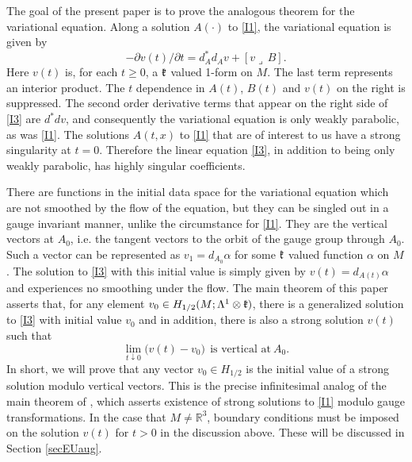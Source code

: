 \documentclass[12pt]{article}
\def \L{\Lambda}
\def \R{\mathbb R}
\def \kf{\frak k}
\def \p{\partial}
\def \beq{\begin{equation}}
\def \eeq{\end{equation}}
\def \eref{\eqref}
\def \lrc{\lrcorner\,}
\numberwithin{equation}{section}
\begin{document}
  The goal of the present paper is to prove the analogous theorem for the variational equation.
Along a solution $A(\cdot)$ to \eref{I1}, the variational equation 
 is given by
\beq
-\p v(t)/\p t = d_A^*d_A v + [v\lrc B].      \label{I3}
\eeq
Here $v(t)$ is, for each $t \ge 0$, a $\kf$ valued 1-form on $M$.  
The last term represents an interior product. 
The $t$ dependence in $A(t)$, $B(t)$ and $v(t)$ on the right is suppressed.
The second order
derivative terms that appear on the right side of \eref{I3} are $d^*d v$,  and  consequently
the  variational equation is only  weakly parabolic, as was \eref{I1}.   
The solutions $A(t,x)$ to 
\eref{I1} that are of interest to us have a strong singularity at $t =0$.
 Therefore the linear equation \eref{I3},
 in addition to being only weakly parabolic,
 has highly singular coefficients. 
 
     There are functions in the initial data space for the variational equation which are
     not smoothed by the flow of the equation, but 
     they can be singled out in a gauge invariant manner, unlike the circumstance for \eref{I1}.  
    They    are the vertical vectors at $A_0$, i.e. the tangent vectors to the 
       orbit of the gauge group through $A_0$.
       Such a vector can be represented as $v_1 = d_{A_0} \alpha$ for some 
       $\kf $ valued function $\alpha$ on $M$. 
       The solution to \eref{I3} with this initial value
       is simply  given by $v(t) = d_{A(t)} \alpha$ and experiences no smoothing under the flow.
        The main theorem of this paper
       asserts that, for any element 
        $v_0 \in H_{1/2}(M; \L^1\otimes \kf)$, there is a generalized solution to \eref{I3} with
          initial value $v_0$  and  in addition, there is also a strong solution $v(t)$ such that
       \beq
\lim_{t\downarrow 0} \Big(v(t) - v_0\Big) \ \ \text{is vertical at}\ A_0.     \label{I4}
\eeq       
     In short,  we will prove that  any vector $v_0 \in H_{1/2}$ is the initial value of
        a strong solution  modulo vertical vectors.  
              This is the precise infinitesimal analog of the main theorem of \cite{G70}, which asserts 
              existence of strong solutions to \eref{I1} modulo gauge transformations. 
                       In the case that $M\ne \R^3$, boundary conditions must be imposed on the solution
 $v(t)$ for $t >0$ in the  discussion above. These will be discussed in Section \ref{secEUaug}.
           
\end{document}
